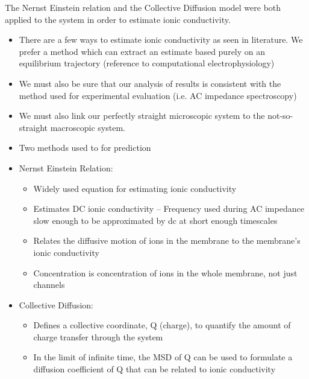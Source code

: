 \documentclass{article}
\begin{document}
	The Nernst Einstein relation and the Collective Diffusion model were both applied to the system in order to estimate ionic conductivity.
	\begin{itemize}
		\item There are a few ways to estimate ionic conductivity as seen in literature. We prefer a method which can extract an estimate based purely on an equilibrium trajectory (reference to computational electrophysiology) 
                \item We must also be sure that our analysis of results is consistent with the method used for experimental evaluation (i.e. AC impedance spectroscopy)
                \item We must also link our perfectly straight microscopic system to the not-so-straight macroscopic system. %
                \item Two methods used to for prediction
                \item Nernst Einstein Relation:
                \begin{itemize}
                        \item Widely used equation for estimating ionic conductivity
                        \item Estimates DC ionic conductivity -- Frequency used during AC impedance slow enough to be approximated by dc at short enough timescales
                        \item Relates the diffusive motion of ions in the membrane to the membrane's ionic conductivity
                        \item Concentration is concentration of ions in the whole membrane, not just channels
                \end{itemize}
                \item Collective Diffusion:  %
                \begin{itemize}
                        \item Defines a collective coordinate, Q (charge), to quantify the amount of charge transfer through the system
                        \item In the limit of infinite time, the MSD of Q can be used to formulate a diffusion coefficient of Q that can be related to ionic conductivity

\end{itemize}
\end{itemize}
\end{document}
